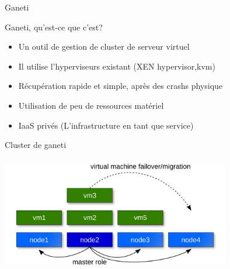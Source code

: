 

%

\begin{frame}
  \begin{center}
   \huge{Ganeti}
  \end{center}
\end{frame}

\begin{frame}{Ganeti, qu'est-ce que c'est?}
\begin{itemize}
\item Un outil de gestion de cluster de serveur virtuel
\pause
\item Il utilise l'hyperviseurs existant (XEN hypervisor,kvm)
\pause
\item Récupération rapide et simple, après des crashs physique
\pause
\item Utilisation de peu de ressources matériel
\pause
\item IaaS privés (L'infrastructure en tant que service)
\end{itemize}
\end{frame}

\begin{frame}{Cluster de ganeti}
\begin{center}
 \includegraphics[width=10cm,height=5cm]{images_presentation/ganeti_cluster.png}
\end{center}
\end{frame}


